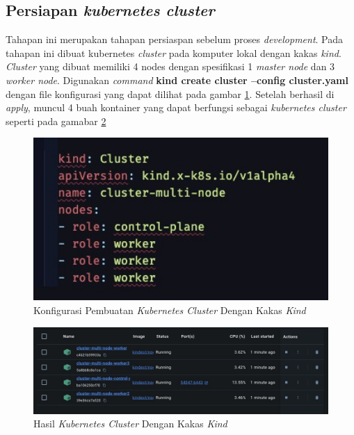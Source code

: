 \subsection{Persiapan \textit{kubernetes cluster}}
\label{subsec:persiapan-kubernetes-cluster}

Tahapan ini merupakan tahapan persiaspan sebelum proses \textit{development}. Pada tahapan ini dibuat kubernetes \textit{cluster} pada komputer lokal dengan kakas \textit{kind}. \textit{Cluster} yang dibuat memiliki 4 nodes dengan spesifikasi 1 \textit{master node} dan 3 \textit{worker node}. Digunakan \textit{command} \textbf{kind create cluster --config cluster.yaml} dengan file konfigurasi yang dapat dilihat pada gambar \ref{fig:konfigurasi-pembuatan-cluster}. Setelah berhasil di \textit{apply}, muncul 4 buah kontainer yang dapat berfungsi sebagai \textit{kubernetes cluster} seperti pada gamabar \ref{fig:hasil-cluster-kind}

\begin{figure}[ht]
  \centering
  \includegraphics[width=1\textwidth]{resources/appendix/pembuatan-cluster.jpg}
  \caption{Konfigurasi Pembuatan \textit{Kubernetes Cluster} Dengan Kakas \textit{Kind}}
  \label{fig:konfigurasi-pembuatan-cluster}
\end{figure}

\begin{figure}[ht]
  \centering
  \includegraphics[width=1\textwidth]{resources/chapter-4/cluster-kind.jpg}
  \caption{Hasil \textit{Kubernetes Cluster} Dengan Kakas \textit{Kind}}
  \label{fig:hasil-cluster-kind}
\end{figure}

\pagebreak